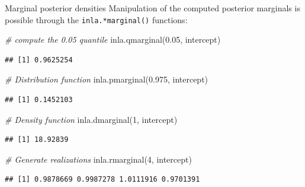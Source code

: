 \documentclass[
  ignorenonframetext,
]{beamer}
\newenvironment{Shaded}{\begin{snugshade}}{\end{snugshade}}
\newcommand{\CommentTok}[1]{\textcolor[rgb]{0.56,0.35,0.01}{\textit{#1}}}
\newcommand{\DecValTok}[1]{\textcolor[rgb]{0.00,0.00,0.81}{#1}}
\newcommand{\FloatTok}[1]{\textcolor[rgb]{0.00,0.00,0.81}{#1}}
\newcommand{\FunctionTok}[1]{\textcolor[rgb]{0.00,0.00,0.00}{#1}}
\newcommand{\NormalTok}[1]{#1}
\begin{document}
\begin{frame}[fragile]{Marginal posterior densities}
\protect\hypertarget{marginal-posterior-densities-2}{}
Manipulation of the computed posterior marginals is possible through the
\texttt{inla.*marginal()} functions:

\small

\begin{Shaded}
\begin{Highlighting}[]
\CommentTok{\# compute the 0.05 quantile}
\FunctionTok{inla.qmarginal}\NormalTok{(}\FloatTok{0.05}\NormalTok{, intercept)}
\end{Highlighting}
\end{Shaded}

\begin{verbatim}
## [1] 0.9625254
\end{verbatim}

\begin{Shaded}
\begin{Highlighting}[]
\CommentTok{\# Distribution function}
\FunctionTok{inla.pmarginal}\NormalTok{(}\FloatTok{0.975}\NormalTok{, intercept)}
\end{Highlighting}
\end{Shaded}

\begin{verbatim}
## [1] 0.1452103
\end{verbatim}

\begin{Shaded}
\begin{Highlighting}[]
\CommentTok{\# Density function}
\FunctionTok{inla.dmarginal}\NormalTok{(}\DecValTok{1}\NormalTok{, intercept)}
\end{Highlighting}
\end{Shaded}

\begin{verbatim}
## [1] 18.92839
\end{verbatim}

\begin{Shaded}
\begin{Highlighting}[]
\CommentTok{\# Generate realizations}
\FunctionTok{inla.rmarginal}\NormalTok{(}\DecValTok{4}\NormalTok{, intercept)}
\end{Highlighting}
\end{Shaded}

\begin{verbatim}
## [1] 0.9878669 0.9987278 1.0111916 0.9701391
\end{verbatim}

\normalsize
\end{frame}
\end{document}
